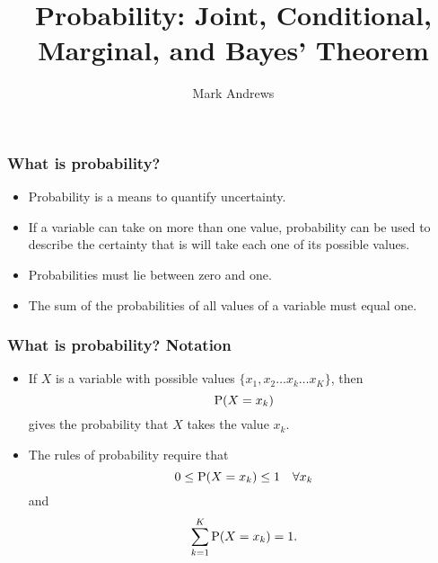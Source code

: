 \documentclass[10pt,xcolor=dvipsnames,serif,professionalfont]{beamer} %
\title[Probability]{Probability: Joint, Conditional, Marginal, and Bayes' Theorem}
\author[Andrews]{Mark Andrews}
\institute[Nottingham Trent University] %
{
  Division of Psychology \\
  Nottingham Trent University}
\date{}
\begin{document}
{
\begin{frame}
   \titlepage
\end{frame}
}

\begin{frame}
\frametitle{What is probability?}
\begin{itemize}
\item Probability is a means to quantify uncertainty.
\item If a variable can take on more than one value, probability can be used to describe the certainty that is will take each one of its possible values.
\item Probabilities must lie between zero and one.
\item The sum of the probabilities of all values of a variable must equal one.
\end{itemize}
\end{frame}

\begin{frame}
\frametitle{What is probability? Notation}
\begin{itemize}
\item If $X$ is a variable with possible values $\{x_1, x_2 \ldots x_k \ldots x_K\}$, then 
\begin{equation}
\mathrm{P}( X = x_k ) 
\end{equation}
gives the probability that $X$ takes the value $x_k$.
\item The rules of probability require that
\begin{equation}
0 \leq \mathrm{P}( X = x_k ) \leq 1 \quad \forall x_k 
\end{equation}
and
\begin{equation}
\sum_{k=1}^K \mathrm{P}( X = x_k ) = 1.
\end{equation}

\end{itemize}
\end{frame}
\end{document}
